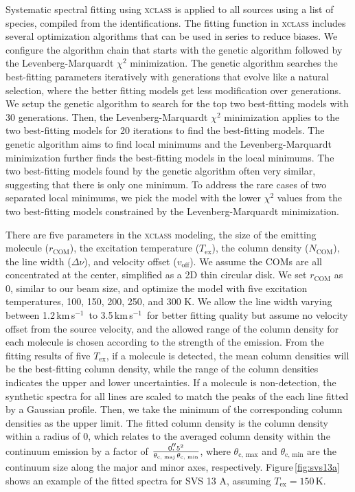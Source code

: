 \documentclass[twocolumn]{aastex62}
\newcommand{\kms}{\mbox{\,km\,s$^{-1}$}}
\begin{document}
Systematic spectral fitting using \textsc{xclass} is applied to all sources using a list of species, compiled from the identifications.  The fitting function in \textsc{xclass} includes several optimization algorithms that can be used in series to reduce biases.  We configure the algorithm chain that starts with the genetic algorithm followed by the Levenberg-Marquardt $\chi^{2}$ minimization.  The genetic algorithm searches the best-fitting parameters iteratively with generations that evolve like a natural selection, where the better fitting models get less modification over generations.  We setup the genetic algorithm to search for the top two best-fitting models with 30 generations.  Then, the Levenberg-Marquardt $\chi^{2}$ minimization applies to the two best-fitting models for 20 iterations to find the best-fitting models.  The genetic algorithm aims to find local minimums and the Levenberg-Marquardt minimization further finds the best-fitting models in the local minimums.  The two best-fitting models found by the genetic algorithm often very similar, suggesting that there is only one minimum.  To address the rare cases of two separated local minimums, we pick the model with the lower $\chi^{2}$ values from the two best-fitting models constrained by the Levenberg-Marquardt minimization.  

There are five parameters in the \textsc{xclass} modeling, the size of the emitting molecule ($r_\text{COM}$), the excitation temperature ($T_\text{ex}$), the column density ($N_\text{COM}$), the line width ($\Delta \nu$), and velocity offset ($v_\text{off}$).  We assume the COMs are all concentrated at the center, simplified as a 2D thin circular disk.  We set $r_\text{COM}$ as 0, similar to our beam size, and optimize the model with five excitation temperatures, 100, 150, 200, 250, and 300 K.  We allow the line width varying between 1.2\kms\ to 3.5\kms\ for better fitting quality but assume no velocity offset from the source velocity, and the allowed range of the column density for each molecule is chosen according to the strength of the emission.  From the fitting results of five $T_\text{ex}$, if a molecule is detected, the mean column densities will be the best-fitting column density, while the range of the column densities indicates the upper and lower uncertainties.  If a molecule is non-detection, the synthetic spectra for all lines are scaled to match the peaks of the each line fitted by a Gaussian profile.  Then, we take the minimum of the corresponding column densities as the upper limit.  The fitted column density is the column density within a radius of 0, which relates to the averaged column density within the continuum emission by a factor of $\frac{0\mbox{$.\!\!^{\prime\prime}$}{5}^{2}}{\theta_\text{c, maj}\,\theta_\text{c, min}}$, where $\theta_\text{c, max}$ and $\theta_\text{c, min}$ are the continuum size along the major and minor axes, respectively.  Figure\,\ref{fig:svs13a} shows an example of the fitted spectra for SVS 13 A, assuming $T_\text{ex} = 150$\,K.
\end{document}
